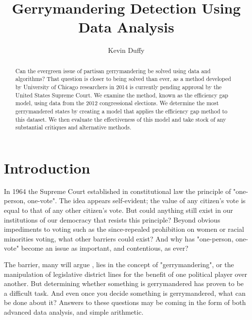 \documentclass[sigconf]{acmart}
\begin{document}
\title{Gerrymandering Detection Using Data Analysis}

\author{Kevin Duffy}

\renewcommand{\shortauthors}{K. Duffy}

\begin{abstract}
Can the evergreen issue of partisan gerrymandering be solved using data and algorithms? That question is closer to being solved than ever, as a method developed by University of Chicago researchers in 2014 is currently pending approval by the United States Supreme Court. We examine the method, known as the efficiency gap model, using data from the 2012 congressional elections. We determine the most gerrymandered states by creating a model that applies the efficiency gap method to this dataset. We then evaluate the effectiveness of this model and take stock of any substantial critiques and alternative methods.
\end{abstract}


\maketitle

\section{Introduction}
In 1964 the Supreme Court established in constitutional law the principle of "one-person, one-vote".\cite{oneperson} The idea appears self-evident; the value of any citizen's vote is equal to that of any other citizen's vote. But could anything still exist in our institutions of our democracy that resists this principle? Beyond obvious impediments to voting such as the since-repealed prohibition on women or racial minorities voting, what other barriers could exist? And why has "one-person, one-vote" become an issue as important, and contentious, as ever?

The barrier, many will argue \cite{wapo}\cite{chicago}\cite{thornburg}, lies in the concept of "gerrymandering", or the manipulation of legislative district lines for the benefit of one political player over another. But determining whether something is gerrymandered has proven to be a difficult task. And even once you decide something is gerrymandered, what can be done about it? Answers to these questions may be coming in the form of both advanced data analysis, and simple arithmetic.
\end{document}
